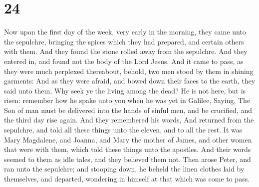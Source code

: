 \hypertarget{section-23}{%
\section{24}\label{section-23}}

 Now upon the first day of the week, very early in the
morning, they came unto the sepulchre, bringing the spices which they
had prepared, and certain others with them.  And they found
the stone rolled away from the sepulchre.  And they entered
in, and found not the body of the Lord Jesus.  And it came
to pass, as they were much perplexed thereabout, behold, two men stood
by them in shining garments:  And as they were afraid, and
bowed down their faces to the earth, they said unto them, Why seek ye
the living among the dead?  He is not here, but is risen:
remember how he spake unto you when he was yet in Galilee, 
Saying, The Son of man must be delivered into the hands of sinful men,
and be crucified, and the third day rise again.  And they
remembered his words,  And returned from the sepulchre, and
told all these things unto the eleven, and to all the rest.
 It was Mary Magdalene, and Joanna, and Mary the mother of
James, and other women that were with them, which told these things unto
the apostles.  And their words seemed to them as idle
tales, and they believed them not.  Then arose Peter, and
ran unto the sepulchre; and stooping down, he beheld the linen clothes
laid by themselves, and departed, wondering in himself at that which was
come to pass.

